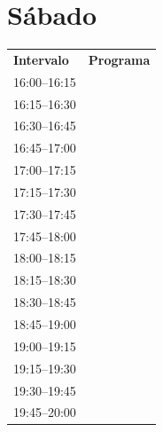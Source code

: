 \documentclass[11pt,a4paper]{article}
\begin{document}
\section*{Sábado}
\begin{center}
\begin{adjustbox}{max totalsize={\textwidth}{0.82\textheight},center}
\begin{tabular}{|p{3.6cm}|p{11cm}|}
\hline
\textbf{Intervalo} & \textbf{Programa} \\
\cline{1-1}
{\centering\rule{0pt}{2.80ex}16:00--16:15} & {\centering\rule{0pt}{2.80ex}} \\
\cline{1-1}
{\centering\rule{0pt}{2.80ex}16:15--16:30} & {\centering\rule{0pt}{2.80ex}} \\
\cline{1-1}
{\centering\rule{0pt}{2.80ex}16:30--16:45} & {\centering\rule{0pt}{2.80ex}} \\
\cline{1-1}
{\centering\rule{0pt}{2.80ex}16:45--17:00} & {\centering\rule{0pt}{2.80ex}} \\
\cline{1-1}
{\centering\rule{0pt}{2.80ex}17:00--17:15} & {\centering\rule{0pt}{2.80ex}} \\
\cline{1-1}
{\centering\rule{0pt}{2.80ex}17:15--17:30} & {\centering\rule{0pt}{2.80ex}} \\
\cline{1-1}
{\centering\rule{0pt}{2.80ex}17:30--17:45} & {\centering\rule{0pt}{2.80ex}} \\
\cline{1-1}
{\centering\rule{0pt}{2.80ex}17:45--18:00} & {\centering\rule{0pt}{2.80ex}} \\
\cline{1-1}
{\centering\rule{0pt}{2.80ex}18:00--18:15} & {\centering\rule{0pt}{2.80ex}} \\
\cline{1-1}
{\centering\rule{0pt}{2.80ex}18:15--18:30} & {\centering\rule{0pt}{2.80ex}} \\
\cline{1-1}
{\centering\rule{0pt}{2.80ex}18:30--18:45} & {\centering\rule{0pt}{2.80ex}} \\
\cline{1-1}
{\centering\rule{0pt}{2.80ex}18:45--19:00} & {\centering\rule{0pt}{2.80ex}} \\
\cline{1-1}
{\centering\rule{0pt}{2.80ex}19:00--19:15} & {\centering\rule{0pt}{2.80ex}} \\
\cline{1-1}
{\centering\rule{0pt}{2.80ex}19:15--19:30} & {\centering\rule{0pt}{2.80ex}} \\
\cline{1-1}
{\centering\rule{0pt}{2.80ex}19:30--19:45} & {\centering\rule{0pt}{2.80ex}} \\
\cline{1-1}
{\centering\rule{0pt}{2.80ex}19:45--20:00} & {\centering\rule{0pt}{2.80ex}} \\

\end{tabular}
\end{adjustbox}
\end{center}
\end{document}
